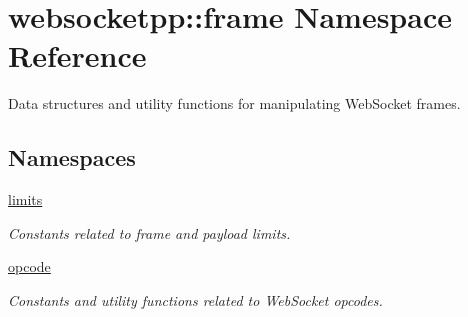 \hypertarget{namespacewebsocketpp_1_1frame}{}\section{websocketpp\+:\+:frame Namespace Reference}
\label{namespacewebsocketpp_1_1frame}


Data structures and utility functions for manipulating Web\+Socket frames.  


\subsection*{Namespaces}
\begin{DoxyCompactItemize}
\item 
 \mbox{\hyperlink{namespacewebsocketpp_1_1frame_1_1limits}{limits}}
\begin{DoxyCompactList}\small\item\em Constants related to frame and payload limits. \end{DoxyCompactList}\item 
 \mbox{\hyperlink{namespacewebsocketpp_1_1frame_1_1opcode}{opcode}}
\begin{DoxyCompactList}\small\item\em Constants and utility functions related to Web\+Socket opcodes. \end{DoxyCompactList}\end{DoxyCompactItemize}
